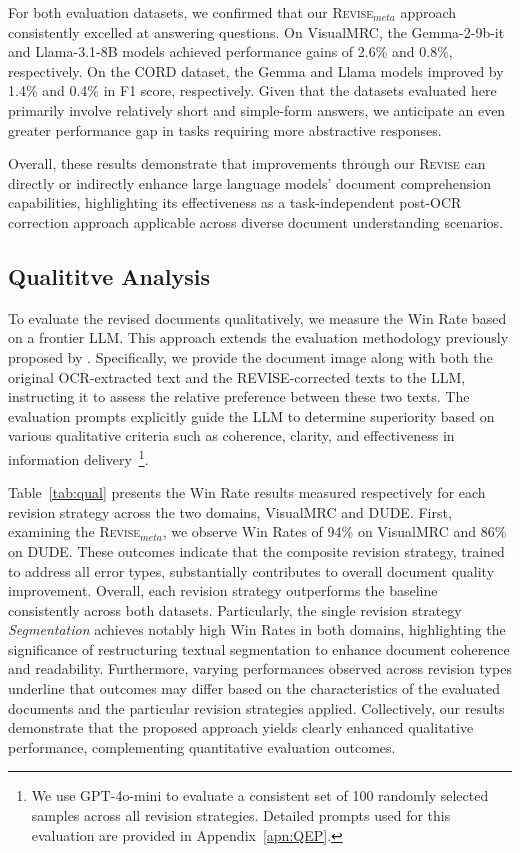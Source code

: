 

For both evaluation datasets, we confirmed that our \textsc{Revise}$_{meta}$ approach consistently excelled at answering questions. On VisualMRC, the Gemma-2-9b-it and Llama-3.1-8B models achieved performance gains of 2.6\% and 0.8\%, respectively. On the CORD dataset, the Gemma and Llama models improved by 1.4\% and 0.4\% in F1 score, respectively. Given that the datasets evaluated here primarily involve relatively short and simple-form answers, we anticipate an even greater performance gap in tasks requiring more abstractive responses. 

Overall, these results demonstrate that improvements through our \textsc{Revise} can directly or indirectly enhance large language models' document comprehension capabilities, highlighting its effectiveness as a task-independent post-OCR correction approach applicable across diverse document understanding scenarios.




\subsection{Qualititve Analysis}



To evaluate the revised documents qualitatively, we measure the Win Rate based on a frontier LLM. This approach extends the evaluation methodology previously proposed by \citet{zheng2023judging}. Specifically, we provide the document image along with both the original OCR-extracted text and the REVISE-corrected texts to the LLM, instructing it to assess the relative preference between these two texts. The evaluation prompts explicitly guide the LLM to determine superiority based on various qualitative criteria such as coherence, clarity, and effectiveness in information delivery~\footnote{We use GPT-4o-mini to evaluate a consistent set of 100 randomly selected samples across all revision strategies. Detailed prompts used for this evaluation are provided in Appendix~\ref{apn:QEP}.}.

Table~\ref{tab:qual} presents the Win Rate results measured respectively for each revision strategy across the two domains, VisualMRC and DUDE. First, examining the \textsc{Revise}$_{meta}$, we observe Win Rates of 94\% on VisualMRC and 86\% on DUDE. These outcomes indicate that the composite revision strategy, trained to address all error types, substantially contributes to overall document quality improvement. Overall, each revision strategy outperforms the baseline consistently across both datasets. Particularly, the single revision strategy \textit{Segmentation} achieves notably high Win Rates in both domains, highlighting the significance of restructuring textual segmentation to enhance document coherence and readability. Furthermore, varying performances observed across revision types underline that outcomes may differ based on the characteristics of the evaluated documents and the particular revision strategies applied. Collectively, our results demonstrate that the proposed approach yields clearly enhanced qualitative performance, complementing quantitative evaluation outcomes.


